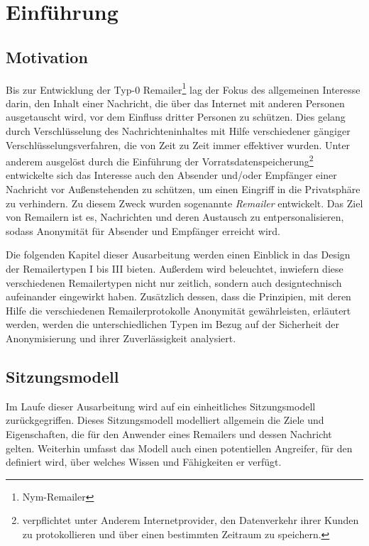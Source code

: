 \chapter{Einführung}

\section{Motivation}
Bis zur Entwicklung der Typ-0 Remailer\footnote{Nym-Remailer} lag der Fokus des allgemeinen Interesse darin, den Inhalt einer Nachricht, die über das Internet mit anderen Personen ausgetauscht wird, vor dem Einfluss dritter Personen zu schützen. Dies gelang durch Verschlüsselung des Nachrichteninhaltes mit Hilfe verschiedener gängiger Verschlüsselungsverfahren, die von Zeit zu Zeit immer effektiver wurden. Unter anderem ausgelöst durch die Einführung der Vorratsdatenspeicherung\footnote{verpflichtet unter Anderem Internetprovider, den Datenverkehr ihrer Kunden zu protokollieren und über einen bestimmten Zeitraum zu speichern.} entwickelte sich das Interesse auch den Absender und/oder Empfänger einer Nachricht vor Außenstehenden zu schützen, um einen Eingriff in die Privatsphäre zu verhindern. Zu diesem Zweck wurden sogenannte \emph{Remailer} entwickelt. Das Ziel von Remailern ist es, Nachrichten und deren Austausch zu entpersonalisieren, sodass Anonymität für Absender und Empfänger erreicht wird.

Die folgenden Kapitel dieser Ausarbeitung werden einen Einblick in das Design der Remailertypen I bis III bieten. Außerdem wird beleuchtet, inwiefern diese verschiedenen Remailertypen nicht nur zeitlich, sondern auch designtechnisch aufeinander eingewirkt haben. Zusätzlich dessen, dass die Prinzipien, mit deren Hilfe die verschiedenen Remailerprotokolle Anonymität gewährleisten, erläutert werden, werden die unterschiedlichen Typen im Bezug auf der Sicherheit der Anonymisierung und ihrer Zuverlässigkeit analysiert.

\section{Sitzungsmodell}
Im Laufe dieser Ausarbeitung wird auf ein einheitliches Sitzungsmodell zurückgegriffen. Dieses Sitzungsmodell modelliert allgemein die Ziele und Eigenschaften, die für den Anwender eines Remailers und dessen Nachricht gelten. Weiterhin umfasst das Modell auch einen potentiellen Angreifer, für den definiert wird, über welches Wissen und Fähigkeiten er verfügt. 

